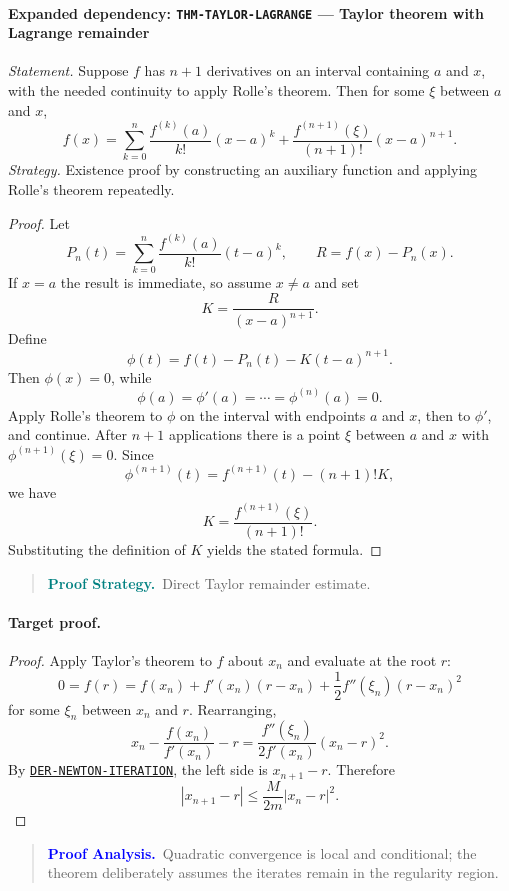 \documentclass[10pt]{article}
\newcommand{\pidraw}[1]{\begingroup\urlstyle{tt}\nolinkurl{#1}\endgroup}
\newcommand{\pidref}[1]{\hyperref[prf:#1]{\pidraw{#1}}}
\newcommand{\pid}[1]{\pidref{#1}}
\theoremstyle{definition}
\theoremstyle{remark}
\newenvironment{proofstrategy}
{\begin{quote}\small\noindent\textbf{\textcolor{teal}{Proof Strategy.}}\ }
{\end{quote}}
\newenvironment{proofanalysis}
{\begin{quote}\small\noindent\textbf{\textcolor{blue}{Proof Analysis.}}\ }
{\end{quote}}
\begin{document}
\paragraph{Expanded dependency: \pidraw{THM-TAYLOR-LAGRANGE} --- Taylor theorem with Lagrange remainder}
\textit{Statement.} Suppose $f$ has $n+1$ derivatives on an interval containing $a$ and $x$, with the needed continuity to apply Rolle's theorem. Then for some $\xi$ between $a$ and $x$,
\[
f(x)=\sum_{k=0}^{n}\frac{f^{(k)}(a)}{k!}(x-a)^k
+\frac{f^{(n+1)}(\xi)}{(n+1)!}(x-a)^{n+1}.
\]
\textit{Strategy.} Existence proof by constructing an auxiliary function and applying Rolle's theorem repeatedly.
\begin{proof}Let
\[
P_n(t)=\sum_{k=0}^{n}\frac{f^{(k)}(a)}{k!}(t-a)^k,
\qquad
R=f(x)-P_n(x).
\]
If $x=a$ the result is immediate, so assume $x\ne a$ and set
\[
K=\frac{R}{(x-a)^{n+1}}.
\]
Define
\[
\phi(t)=f(t)-P_n(t)-K(t-a)^{n+1}.
\]
Then $\phi(x)=0$, while
\[
\phi(a)=\phi'(a)=\cdots=\phi^{(n)}(a)=0.
\]
Apply Rolle's theorem to $\phi$ on the interval with endpoints $a$ and $x$,
then to $\phi'$, and continue. After $n+1$ applications there is a point
$\xi$ between $a$ and $x$ with $\phi^{(n+1)}(\xi)=0$. Since
\[
\phi^{(n+1)}(t)=f^{(n+1)}(t)-(n+1)!K,
\]
we have
\[
K=\frac{f^{(n+1)}(\xi)}{(n+1)!}.
\]
Substituting the definition of $K$ yields the stated formula.\end{proof}

\begin{proofstrategy}Direct Taylor remainder estimate.\end{proofstrategy}

\paragraph{Target proof.}

\begin{proof}

Apply Taylor's theorem to $f$ about $x_n$ and evaluate at the root $r$:
\[
0=f(r)=f(x_n)+f'(x_n)(r-x_n)
+\frac12 f''(\xi_n)(r-x_n)^2
\]
for some $\xi_n$ between $x_n$ and $r$. Rearranging,
\[
x_n-\frac{f(x_n)}{f'(x_n)}-r
=
\frac{f''(\xi_n)}{2f'(x_n)}(x_n-r)^2.
\]
By \pid{DER-NEWTON-ITERATION}, the left side is $x_{n+1}-r$. Therefore
\[
|x_{n+1}-r|
\le
\frac{M}{2m}|x_n-r|^2.
\]

\end{proof}

\begin{proofanalysis}Quadratic convergence is local and conditional; the theorem deliberately assumes the iterates remain in the regularity region.\end{proofanalysis}
\end{document}
